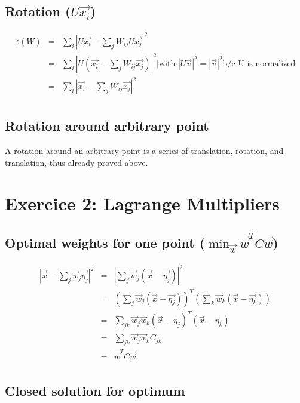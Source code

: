 \documentclass{article}
\begin{document}
\subsection{Rotation ($U\vec{x_i}$)}

  \begin{eqnarray*}
    \varepsilon(W) &=& \sum_i |U \vec{x_i} - \sum_j W_{ij} U \vec{x_j}|^2\\
    &=& \sum_i |U(\vec{x_i} - \sum_j W_{ij} \vec{x_j})|^2 \Big\vert \text{with } |U\vec{v}|^2 = |\vec{v}|^2 \text{b/c U is normalized}\\
    &=& \sum_i |\vec{x_i} - \sum_j W_{ij} \vec{x_j}|^2\\
  \end{eqnarray*}

\subsection{Rotation around arbitrary point}

A rotation around an arbitrary point is a series of translation,
rotation, and translation, thus already proved above.

\section{Exercice 2: Lagrange Multipliers}

\subsection{Optimal weights for one point ($\min_{\vec{w}} \vec{w}^TC\vec{w}$)}

  \begin{eqnarray*}
    |\vec{x} - \sum_j \vec{w}_j \vec{\eta_j}|^2 &=& |\sum_j \vec{w}_j (\vec{x} - \vec{\eta_j})|^2\\
    &=& (\sum_j \vec{w}_j (\vec{x} - \vec{\eta_j}))^T (\sum_k \vec{w}_k (\vec{x} - \vec{\eta_k}))\\
    &=& \sum_{jk} \vec{w}_j \vec{w}_k (\vec{x} - \eta_j)^T(\vec{x} - \eta_k)\\
    &=& \sum_{jk} \vec{w}_j \vec{w}_k C_{jk}\\
    &=& \vec{w}^T C \vec{w}\\
  \end{eqnarray*}

\subsection{Closed solution for optimum}
\end{document}
